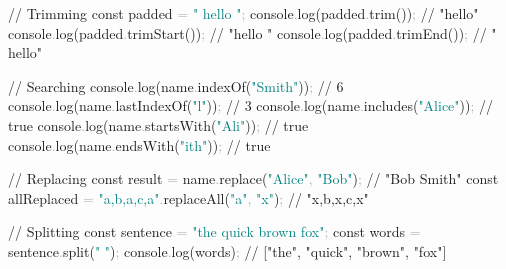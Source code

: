 \documentclass[
  justified,
  openright,
]{tufte-book}
\newcommand{\BuiltInTok}[1]{#1}
\newcommand{\CommentTok}[1]{\textcolor{MidGray}{#1}}
\newcommand{\FunctionTok}[1]{\textcolor{BrandBlue}{#1}}
\newcommand{\KeywordTok}[1]{\textcolor{BrandBlue}{#1}}
\newcommand{\NormalTok}[1]{#1}
\newcommand{\OperatorTok}[1]{\textcolor{DarkGray}{#1}}
\newcommand{\StringTok}[1]{\textcolor{Teal}{#1}}
\newenvironment{Shaded}{%
  \begin{snugshade}
}{%
  \end{snugshade}
}
\begin{document}
\begin{Shaded}
\begin{Highlighting}[]
\CommentTok{// Trimming}
\KeywordTok{const}\NormalTok{ padded }\OperatorTok{=} \StringTok{"  hello  "}\OperatorTok{;}
\BuiltInTok{console}\OperatorTok{.}\FunctionTok{log}\NormalTok{(padded}\OperatorTok{.}\FunctionTok{trim}\NormalTok{())}\OperatorTok{;} \CommentTok{// "hello"}
\BuiltInTok{console}\OperatorTok{.}\FunctionTok{log}\NormalTok{(padded}\OperatorTok{.}\FunctionTok{trimStart}\NormalTok{())}\OperatorTok{;} \CommentTok{// "hello  "}
\BuiltInTok{console}\OperatorTok{.}\FunctionTok{log}\NormalTok{(padded}\OperatorTok{.}\FunctionTok{trimEnd}\NormalTok{())}\OperatorTok{;} \CommentTok{// "  hello"}

\CommentTok{// Searching}
\BuiltInTok{console}\OperatorTok{.}\FunctionTok{log}\NormalTok{(name}\OperatorTok{.}\FunctionTok{indexOf}\NormalTok{(}\StringTok{"Smith"}\NormalTok{))}\OperatorTok{;} \CommentTok{// 6}
\BuiltInTok{console}\OperatorTok{.}\FunctionTok{log}\NormalTok{(name}\OperatorTok{.}\FunctionTok{lastIndexOf}\NormalTok{(}\StringTok{"l"}\NormalTok{))}\OperatorTok{;} \CommentTok{// 3}
\BuiltInTok{console}\OperatorTok{.}\FunctionTok{log}\NormalTok{(name}\OperatorTok{.}\FunctionTok{includes}\NormalTok{(}\StringTok{"Alice"}\NormalTok{))}\OperatorTok{;} \CommentTok{// true}
\BuiltInTok{console}\OperatorTok{.}\FunctionTok{log}\NormalTok{(name}\OperatorTok{.}\FunctionTok{startsWith}\NormalTok{(}\StringTok{"Ali"}\NormalTok{))}\OperatorTok{;} \CommentTok{// true}
\BuiltInTok{console}\OperatorTok{.}\FunctionTok{log}\NormalTok{(name}\OperatorTok{.}\FunctionTok{endsWith}\NormalTok{(}\StringTok{"ith"}\NormalTok{))}\OperatorTok{;} \CommentTok{// true}

\CommentTok{// Replacing}
\KeywordTok{const}\NormalTok{ result }\OperatorTok{=}\NormalTok{ name}\OperatorTok{.}\FunctionTok{replace}\NormalTok{(}\StringTok{"Alice"}\OperatorTok{,} \StringTok{"Bob"}\NormalTok{)}\OperatorTok{;} \CommentTok{// "Bob Smith"}
\KeywordTok{const}\NormalTok{ allReplaced }\OperatorTok{=} \StringTok{"a,b,a,c,a"}\OperatorTok{.}\FunctionTok{replaceAll}\NormalTok{(}\StringTok{"a"}\OperatorTok{,} \StringTok{"x"}\NormalTok{)}\OperatorTok{;} \CommentTok{// "x,b,x,c,x"}

\CommentTok{// Splitting}
\KeywordTok{const}\NormalTok{ sentence }\OperatorTok{=} \StringTok{"the quick brown fox"}\OperatorTok{;}
\KeywordTok{const}\NormalTok{ words }\OperatorTok{=}\NormalTok{ sentence}\OperatorTok{.}\FunctionTok{split}\NormalTok{(}\StringTok{" "}\NormalTok{)}\OperatorTok{;}
\BuiltInTok{console}\OperatorTok{.}\FunctionTok{log}\NormalTok{(words)}\OperatorTok{;} \CommentTok{// ["the", "quick", "brown", "fox"]}


\end{Highlighting}
\end{Shaded}
\end{document}
